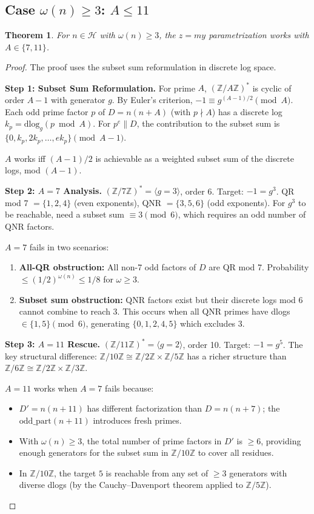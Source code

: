 \documentclass[11pt,a4paper]{article}
\theoremstyle{plain}
\newtheorem{theorem}{Theorem}[section]
\theoremstyle{definition}
\newcommand{\Z}{\mathbb{Z}}
\newcommand{\Zp}[1]{\Z/#1\Z}
\newcommand{\dlog}{\mathrm{dlog}}
\newcommand{\Hard}{\mathcal{H}}
\newcommand{\oddpart}{\mathrm{odd\_part}}
\begin{document}
\subsection{Case $\omega(n) \geq 3$: $A \leq 11$}

\begin{theorem}
\label{thm:omega3}
For $n \in \Hard$ with $\omega(n) \geq 3$, the $z = my$ parametrization works with $A \in \{7, 11\}$.
\end{theorem}

\begin{proof}
The proof uses the subset sum reformulation in discrete log space.

\medskip
\noindent\textbf{Step 1: Subset Sum Reformulation.}
For prime $A$, $(\Zp{A})^*$ is cyclic of order $A - 1$ with generator $g$. By Euler's criterion, $-1 \equiv g^{(A-1)/2} \pmod{A}$. Each odd prime factor $p$ of $D = n(n+A)$ (with $p \nmid A$) has a discrete log $k_p = \dlog_g(p \bmod A)$. For $p^e \| D$, the contribution to the subset sum is $\{0, k_p, 2k_p, \ldots, ek_p\} \pmod{A-1}$.

$A$ works iff $(A-1)/2$ is achievable as a weighted subset sum of the discrete logs, mod $(A-1)$.

\medskip
\noindent\textbf{Step 2: $A = 7$ Analysis.}
$(\Zp{7})^* = \langle g = 3 \rangle$, order 6. Target: $-1 = g^3$. QR mod 7 $= \{1, 2, 4\}$ (even exponents), QNR $= \{3, 5, 6\}$ (odd exponents). For $g^3$ to be reachable, need a subset sum $\equiv 3 \pmod{6}$, which requires an odd number of QNR factors.

$A = 7$ fails in two scenarios:
\begin{enumerate}
\item \textbf{All-QR obstruction:} All non-7 odd factors of $D$ are QR mod 7. Probability $\leq (1/2)^{\omega(n)} \leq 1/8$ for $\omega \geq 3$.
\item \textbf{Subset sum obstruction:} QNR factors exist but their discrete logs mod 6 cannot combine to reach 3. This occurs when all QNR primes have dlogs $\in \{1, 5\} \pmod{6}$, generating $\{0, 1, 2, 4, 5\}$ which excludes 3.
\end{enumerate}

\medskip
\noindent\textbf{Step 3: $A = 11$ Rescue.}
$(\Zp{11})^* = \langle g = 2 \rangle$, order 10. Target: $-1 = g^5$. The key structural difference: $\Zp{10} \cong \Zp{2} \times \Zp{5}$ has a richer structure than $\Zp{6} \cong \Zp{2} \times \Zp{3}$.

$A = 11$ works when $A = 7$ fails because:
\begin{itemize}
\item $D' = n(n+11)$ has different factorization than $D = n(n+7)$; the $\oddpart(n+11)$ introduces fresh primes.
\item With $\omega(n) \geq 3$, the total number of prime factors in $D'$ is $\geq 6$, providing enough generators for the subset sum in $\Zp{10}$ to cover all residues.
\item In $\Zp{10}$, the target $5$ is reachable from any set of $\geq 3$ generators with diverse dlogs (by the Cauchy--Davenport theorem applied to $\Zp{5}$).
\end{itemize}


\end{proof}
\end{document}
